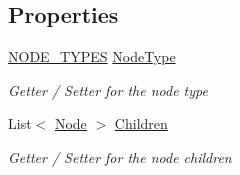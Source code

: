 \subsection*{Properties}
\begin{DoxyCompactItemize}
\item 
\hyperlink{class_web_analyzer_1_1_models_1_1_settings_model_1_1_expression_tree_1_1_node_a89c72b19ff778cbc04788f4cb47a730e}{N\+O\+D\+E\+\_\+\+T\+Y\+P\+E\+S} \hyperlink{class_web_analyzer_1_1_models_1_1_settings_model_1_1_expression_tree_1_1_node_a326bab10d73a525224fcf5b061491dda}{Node\+Type}
\begin{DoxyCompactList}\small\item\em Getter / Setter for the node type \end{DoxyCompactList}\item 
List$<$ \hyperlink{class_web_analyzer_1_1_models_1_1_settings_model_1_1_expression_tree_1_1_node}{Node} $>$ \hyperlink{class_web_analyzer_1_1_models_1_1_settings_model_1_1_expression_tree_1_1_node_af97835cf31c19c83f0044bbd6f4a9e91}{Children}
\begin{DoxyCompactList}\small\item\em Getter / Setter for the node children \end{DoxyCompactList}\end{DoxyCompactItemize}

